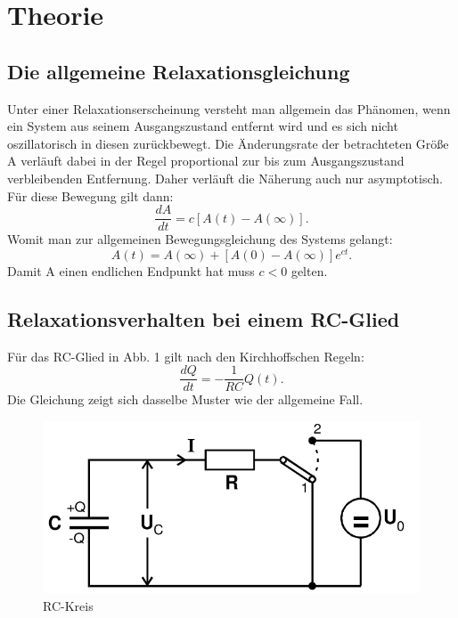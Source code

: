 \section{Theorie}
\label{sec:Theorie}
\subsection{Die allgemeine Relaxationsgleichung}
Unter einer Relaxationserscheinung versteht man allgemein das Phänomen, wenn
 ein System aus seinem Ausgangszustand entfernt wird und es sich nicht oszillatorisch
 in diesen zurückbewegt. Die Änderungsrate der betrachteten Größe A verläuft dabei
 in der Regel proportional zur bis zum Ausgangszustand verbleibenden Entfernung. Daher
  verläuft die Näherung auch nur asymptotisch. Für diese
 Bewegung gilt dann:
 \begin{equation}
   \frac{dA}{dt} = c[A(t)-A(\infty)]\text{.}
 \end{equation}
Womit man zur allgemeinen Bewegungsgleichung des Systems gelangt:
\begin{equation}
  A(t) = A(\infty)+[A(0)-A(\infty)]e^{ct}\text{.}
\end{equation}
Damit A einen endlichen Endpunkt hat muss $ c < 0$ gelten.

\subsection{Relaxationsverhalten bei einem RC-Glied}

Für das RC-Glied in Abb. 1 gilt nach den Kirchhoffschen Regeln:
\begin{equation}
  \frac{dQ}{dt} = -\frac{1}{RC}Q(t)\text{.}
\end{equation}
Die Gleichung zeigt sich dasselbe Muster wie der allgemeine Fall.
\begin{figure}[H]
  \centering
  \includegraphics[width=\linewidth-200pt,height=\textheight-200pt,keepaspectratio]{content/RC_Kreis1.png}
  \caption{RC-Kreis \cite{V353}}
  \label{fig:RC_Kreis1}
\end{figure}

